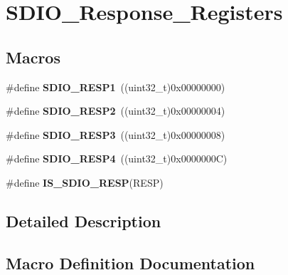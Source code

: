 \hypertarget{group___s_d_i_o___response___registers}{}\section{S\+D\+I\+O\+\_\+\+Response\+\_\+\+Registers}
\label{group___s_d_i_o___response___registers}
\subsection*{Macros}
\begin{DoxyCompactItemize}
\item 
\hypertarget{group___s_d_i_o___response___registers_ga9d78943952cf0e36736313d949520a2d}{}\#define {\bfseries S\+D\+I\+O\+\_\+\+R\+E\+S\+P1}~((uint32\+\_\+t)0x00000000)\label{group___s_d_i_o___response___registers_ga9d78943952cf0e36736313d949520a2d}

\item 
\hypertarget{group___s_d_i_o___response___registers_gabd551272af4161844b5358fd3c3c379c}{}\#define {\bfseries S\+D\+I\+O\+\_\+\+R\+E\+S\+P2}~((uint32\+\_\+t)0x00000004)\label{group___s_d_i_o___response___registers_gabd551272af4161844b5358fd3c3c379c}

\item 
\hypertarget{group___s_d_i_o___response___registers_gae9887669a72395d54d600829a959d2f4}{}\#define {\bfseries S\+D\+I\+O\+\_\+\+R\+E\+S\+P3}~((uint32\+\_\+t)0x00000008)\label{group___s_d_i_o___response___registers_gae9887669a72395d54d600829a959d2f4}

\item 
\hypertarget{group___s_d_i_o___response___registers_ga57c3f6414198e5497736e398c02a1d9e}{}\#define {\bfseries S\+D\+I\+O\+\_\+\+R\+E\+S\+P4}~((uint32\+\_\+t)0x0000000\+C)\label{group___s_d_i_o___response___registers_ga57c3f6414198e5497736e398c02a1d9e}

\item 
\#define {\bfseries I\+S\+\_\+\+S\+D\+I\+O\+\_\+\+R\+E\+S\+P}(R\+E\+S\+P)
\end{DoxyCompactItemize}


\subsection{Detailed Description}


\subsection{Macro Definition Documentation}
\hypertarget{group___s_d_i_o___response___registers_gaea6a7f75a5e677d50ba5c9ae2d3a7839}{}
